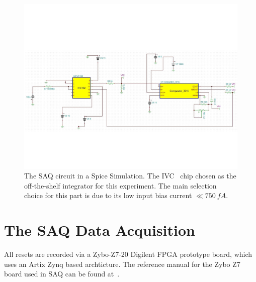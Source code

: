 \begin{figure}[]
\centering
\includegraphics[width=\textwidth]{images/SAQ_spice_circuit.pdf}
\caption{The SAQ circuit in a Spice Simulation.
The IVC~\citep{ivc_datasheet} chip chosen as the off-the-shelf integrator for this experiment.
The main selection choice for this part is due to its low input bias current $\ll 750~\unit{fA}$.}
\label{fig:saq_circuit_spice}
\end{figure}


\section{The SAQ Data Acquisition}

All resets are recorded via a Zybo-Z7-20 Digilent FPGA prototype board, which uses an Artix Zynq based archticture.
The reference manual for the Zybo Z7 board used in SAQ can be found at~\citep{zybo_zy_reference}.

